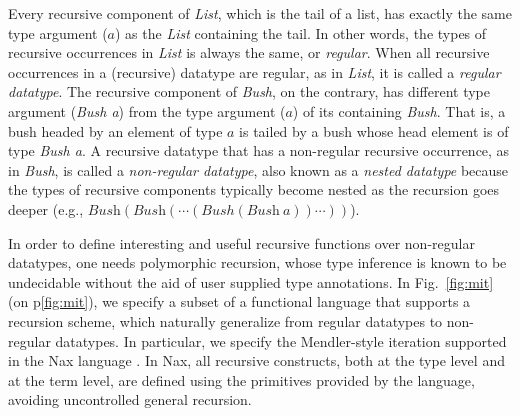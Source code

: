 \documentclass[runningheads,a4paper]{llncs}
\begin{document}
Every recursive component of \textit{List}, which is the tail of a list,
has exactly the same type argument ($a$) as the \textit{List} containing
the tail. In other words, the types of recursive occurrences in \textit{List}
is always the same, or \emph{regular}. When all recursive occurrences in
a (recursive) datatype are regular, as in \emph{List}, it is called
a \emph{regular datatype}. The recursive component of \textit{Bush},
on the contrary, has different type argument (\textit{Bush a}) from
the type argument ($a$) of its containing \textit{Bush}. That is,
a bush headed by an element of type $a$ is tailed by a bush whose
head element is of type \emph{Bush a}. A recursive datatype that
has a non-regular recursive occurrence, as in \emph{Bush}, is called
a \emph{non-regular datatype}, also known as
a \emph{nested datatype}\;\cite{BirMee98} because the types of
recursive components typically become nested as the recursion goes deeper
(e.g., $\textit{Bush}(\textit{Bush}(\cdots(Bush(\textit{Bush}~a))\cdots))$).

In order to define interesting and useful recursive functions over
non-regular datatypes, one needs polymorphic recursion, whose 
type inference is known to be undecidable without the aid of
user supplied type annotations. In Fig.~\ref{fig:mit} (on p\ref{fig:mit}),
we specify a subset of a functional language that supports a recursion scheme,
which naturally generalize from regular datatypes to non-regular datatypes.
In particular, we specify
the Mendler-style iteration \cite{matthes98phd,AbeMatUus03}
supported in the Nax language \cite{Ahn14thesis}. In Nax,
all recursive constructs, both at the type level and at the term level,
are defined using the primitives provided by the language, avoiding
uncontrolled general recursion.

\end{document}
